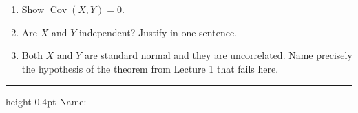 \documentclass[11pt]{article}
\newcommand{\Cov}{\operatorname{Cov}}
\begin{document}
\begin{enumerate}[label=(\alph*),leftmargin=1.8em,itemsep=0.35em,topsep=0.35em]
\item Show $\Cov(X,Y)=0$.
\item Are $X$ and $Y$ independent? Justify in one sentence.
\item Both $X$ and $Y$ are standard normal and they are uncorrelated. Name precisely the hypothesis of the theorem from Lecture 1 that fails here.
\end{enumerate}

\vspace{2.2em}
\hrule height 0.4pt
\vspace{0.3em}
{\footnotesize\color{grey} Name:\hspace{16em}\hrulefill}
\end{document}
